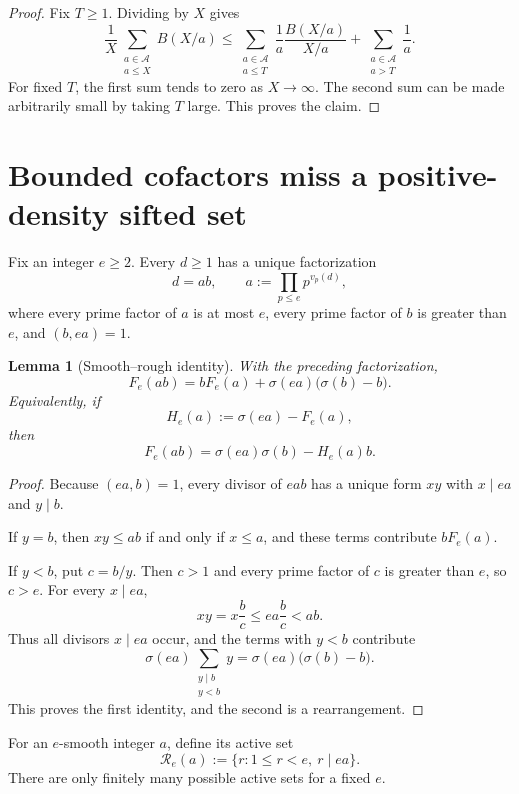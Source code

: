 \documentclass[11pt]{article}
\newtheorem{lemma}[theorem]{Lemma}
\theoremstyle{definition}
\theoremstyle{remark}
\begin{document}
\begin{proof}
Fix $T\geq1$.  Dividing by $X$ gives
\[
\frac1X\sum_{\substack{a\in\mathcal A\\a\leq X}}B(X/a)
\leq
\sum_{\substack{a\in\mathcal A\\a\leq T}}
\frac1a\frac{B(X/a)}{X/a}
+
\sum_{\substack{a\in\mathcal A\\a>T}}\frac1a.
\]
For fixed $T$, the first sum tends to zero as $X\to\infty$.  The second sum can be made arbitrarily small by taking $T$ large.  This proves the claim.
\end{proof}

\section{Bounded cofactors miss a positive-density sifted set}

Fix an integer $e\geq2$.  Every $d\geq1$ has a unique factorization
\[
d=ab,
\qquad
 a:=\prod_{p\leq e}p^{v_p(d)},
\]
where every prime factor of $a$ is at most $e$, every prime factor of $b$ is greater than $e$, and $(b,ea)=1$.

\begin{lemma}[Smooth--rough identity]\label{lem:smooth-rough}
With the preceding factorization,
\[
F_e(ab)=bF_e(a)+\sigma(ea)\bigl(\sigma(b)-b\bigr).
\]
Equivalently, if
\[
H_e(a):=\sigma(ea)-F_e(a),
\]
then
\[
F_e(ab)=\sigma(ea)\sigma(b)-H_e(a)b. \tag{5.1}\label{eq:smooth-rough}
\]
\end{lemma}

\begin{proof}
Because $(ea,b)=1$, every divisor of $eab$ has a unique form $xy$ with $x\mid ea$ and $y\mid b$.

If $y=b$, then $xy\leq ab$ if and only if $x\leq a$, and these terms contribute $bF_e(a)$.

If $y<b$, put $c=b/y$.  Then $c>1$ and every prime factor of $c$ is greater than $e$, so $c>e$.  For every $x\mid ea$,
\[
xy=x\frac bc\leq ea\frac bc<ab.
\]
Thus all divisors $x\mid ea$ occur, and the terms with $y<b$ contribute
\[
\sigma(ea)\sum_{\substack{y\mid b\\y<b}}y
=\sigma(ea)\bigl(\sigma(b)-b\bigr).
\]
This proves the first identity, and the second is a rearrangement.
\end{proof}

For an $e$-smooth integer $a$, define its active set
\[
\mathcal R_e(a):=\{r:1\leq r<e,\ r\mid ea\}.
\]
There are only finitely many possible active sets for a fixed $e$.
\end{document}
